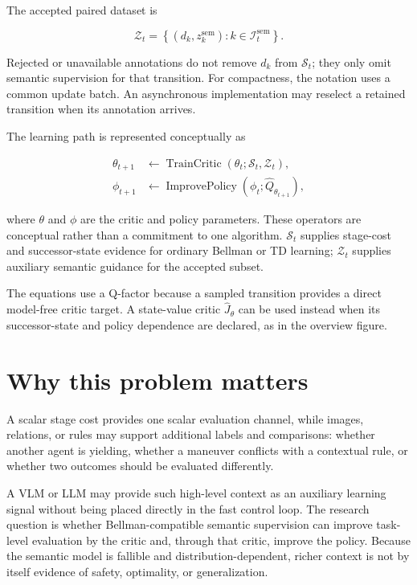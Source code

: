 \documentclass[a4paper]{article}
\begin{document}
The accepted paired dataset is

\begin{equation}
\mathcal Z_t
=
\left\{
(d_k,z_k^{\mathrm{sem}})
:
k\in\mathcal I_t^{\mathrm{sem}}
\right\}.
\end{equation}

Rejected or unavailable annotations do not remove $d_k$ from
$\mathcal S_t$; they only omit semantic supervision for that transition. For
compactness, the notation uses a common update batch. An asynchronous
implementation may reselect a retained transition when its annotation
arrives.

The learning path is represented conceptually as

\begin{equation}
\begin{aligned}
\theta_{t+1}
&\leftarrow
\operatorname{TrainCritic}
\!\left(
\theta_t;\mathcal S_t,\mathcal Z_t
\right),\\
\phi_{t+1}
&\leftarrow
\operatorname{ImprovePolicy}
\!\left(
\phi_t;\widehat Q_{\theta_{t+1}}
\right),
\end{aligned}
\end{equation}

where $\theta$ and $\phi$ are the critic and policy parameters. These
operators are conceptual rather than a commitment to one algorithm.
$\mathcal S_t$ supplies stage-cost and successor-state evidence for ordinary
Bellman or TD learning; $\mathcal Z_t$ supplies auxiliary semantic guidance
for the accepted subset.

The equations use a Q-factor because a sampled transition provides a direct
model-free critic target. A state-value critic $\widehat J_\theta$ can be used
instead when its successor-state and policy dependence are declared, as in
the overview figure.

\section{Why this problem matters}

A scalar stage cost provides one scalar evaluation channel, while images,
relations, or rules may support additional labels and comparisons: whether
another agent is yielding, whether a maneuver conflicts with a contextual
rule, or whether two outcomes should be evaluated differently.

A VLM or LLM may provide such high-level context as an auxiliary learning
signal without being placed directly in the fast control loop. The research
question is whether Bellman-compatible semantic supervision can improve
task-level evaluation by the critic and, through that critic, improve the
policy. Because the semantic model is fallible and distribution-dependent,
richer context is not by itself evidence of safety, optimality, or
generalization.
\end{document}
